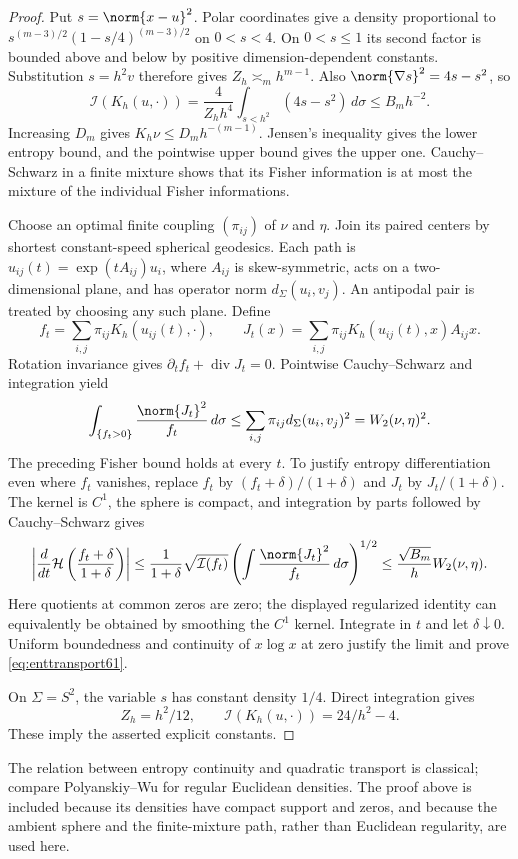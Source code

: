 \begin{proof}
Put $s=\norm{x-u}^2$. Polar coordinates give a density proportional to
$s^{(m-3)/2}(1-s/4)^{(m-3)/2}$ on $0<s<4$. On $0<s\le1$ its second
factor is bounded above and below by positive dimension-dependent
constants. Substitution $s=h^2v$ therefore gives
$Z_h\asymp_m h^{m-1}$. Also $\norm{\nabla s}^2=4s-s^2$, so
\[
 \mathcal I(K_h(u,\cdot))=
 \frac4{Z_hh^4}\int_{s<h^2}(4s-s^2)\,d\sigma
                            \le B_mh^{-2}.
\]
Increasing $D_m$ gives $K_h\nu\le D_mh^{-(m-1)}$.
Jensen's inequality gives the lower entropy bound, and the pointwise
upper bound gives the upper one. Cauchy--Schwarz in a finite mixture
shows that its Fisher information is at most the mixture of the
individual Fisher informations.

Choose an optimal finite coupling $(\pi_{ij})$ of $\nu$ and $\eta$.
Join its paired centers by shortest constant-speed spherical geodesics.
Each path is $u_{ij}(t)=\exp(tA_{ij})u_i$, where $A_{ij}$ is
skew-symmetric, acts on a two-dimensional plane, and has operator norm
$d_\Sigma(u_i,v_j)$. An antipodal pair is treated by choosing any such
plane. Define
\[
 f_t=\sum_{i,j}\pi_{ij}K_h(u_{ij}(t),\cdot),\qquad
 J_t(x)=\sum_{i,j}\pi_{ij}K_h(u_{ij}(t),x)A_{ij}x.
\]
Rotation invariance gives $\partial_t f_t+\operatorname{div}J_t=0$.
Pointwise Cauchy--Schwarz and integration yield
\[
 \int_{\{f_t>0\}}\frac{\norm{J_t}^2}{f_t}\,d\sigma
 \le\sum_{i,j}\pi_{ij}d_\Sigma(u_i,v_j)^2=W_2(\nu,\eta)^2.
\]
The preceding Fisher bound holds at every $t$. To justify entropy
differentiation even where $f_t$ vanishes, replace $f_t$ by
$(f_t+\delta)/(1+\delta)$ and $J_t$ by $J_t/(1+\delta)$.
The kernel is $C^1$, the sphere is compact, and integration by parts
followed by Cauchy--Schwarz gives
\[
 \left|\frac d{dt}\mathcal H\left(\frac{f_t+\delta}{1+\delta}\right)\right|
 \le\frac1{1+\delta}\sqrt{\mathcal I(f_t)}
       \left(\int\frac{\norm{J_t}^2}{f_t}\,d\sigma\right)^{1/2}
 \le\frac{\sqrt{B_m}}h W_2(\nu,\eta).
\]
Here quotients at common zeros are zero; the displayed regularized
identity can equivalently be obtained by smoothing the $C^1$ kernel.
Integrate in $t$ and let $\delta\downarrow0$. Uniform boundedness and
continuity of $x\log x$ at zero justify the limit and prove
\eqref{eq:enttransport61}.

On $\Sigma=S^2$, the variable $s$ has constant density $1/4$.
Direct integration gives
\[
 Z_h=h^2/12,\qquad
 \mathcal I(K_h(u,\cdot))=24/h^2-4.
\]
These imply the asserted explicit constants.
\end{proof}
The relation between entropy continuity and quadratic transport is
classical; compare Polyanskiy--Wu \cite[Proposition~1]{PW61} for regular
Euclidean densities. The proof above is included because its densities
have compact support and zeros, and because the ambient sphere and the
finite-mixture path, rather than Euclidean regularity, are used here.

